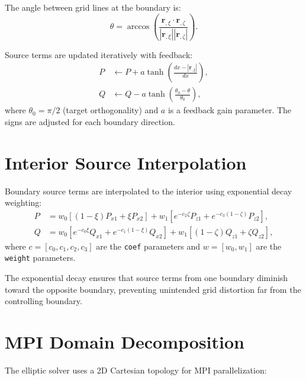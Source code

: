 \documentclass[11pt,a4paper]{report}
\newcommand{\rvec}{\bm{r}}
\begin{document}
The angle between grid lines at the boundary is:
\begin{equation}
    \theta = \arccos\left( \frac{\rvec_{,\xi} \cdot \rvec_{,\zeta}}{|\rvec_{,\xi}| |\rvec_{,\zeta}|} \right).
\end{equation}

Source terms are updated iteratively with feedback:
\begin{equation}
\begin{aligned}
    P &\leftarrow P + a \tanh\left( \frac{dx - |\rvec_{,\xi}|}{dx} \right), \\
    Q &\leftarrow Q - a \tanh\left( \frac{\theta_0 - \theta}{\theta_0} \right),
\end{aligned}
\end{equation}
where $\theta_0 = \pi/2$ (target orthogonality) and $a$ is a feedback gain parameter. The signs are adjusted for each boundary direction.

\section{Interior Source Interpolation}

Boundary source terms are interpolated to the interior using exponential decay weighting:
\begin{equation}
\begin{aligned}
    P &= w_0 \left[ (1-\xi) P_{x1} + \xi P_{x2} \right] + w_1 \left[ e^{-c_2\zeta} P_{z1} + e^{-c_3(1-\zeta)} P_{z2} \right], \\
    Q &= w_0 \left[ e^{-c_0\xi} Q_{x1} + e^{-c_1(1-\xi)} Q_{x2} \right] + w_1 \left[ (1-\zeta) Q_{z1} + \zeta Q_{z2} \right],
\end{aligned}
\end{equation}
where $c = [c_0, c_1, c_2, c_3]$ are the \texttt{coef} parameters and $w = [w_0, w_1]$ are the \texttt{weight} parameters.

The exponential decay ensures that source terms from one boundary diminish toward the opposite boundary, preventing unintended grid distortion far from the controlling boundary.

\section{MPI Domain Decomposition}

The elliptic solver uses a 2D Cartesian topology for MPI parallelization:
\end{document}
